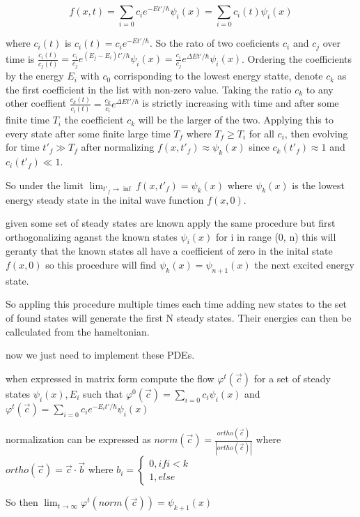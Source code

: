 \documentclass[%
 preprint,
 amsmath, amssymb, aps, pra, 10pt
]{revtex4-2}
\begin{document}
\[
f(x, t) = \sum_{i=0} c_i e^{-Et' / \hbar}\psi_i(x) = \sum_{i=0} c_i(t)\psi_i(x)
\]

where $c_i(t)$ is $c_i(t) = c_i e^{-Et' / \hbar}$. So the rato of two coeficients $c_i$ and $c_j$ over time is $\frac{c_i(t)}{c_j(t)} = \frac{c_i}{c_j} e^{(E_j - E_i)t' / \hbar}\psi_i(x) = \frac{c_i}{c_j} e^{\Delta Et' / \hbar}\psi_i(x)$. Ordering the coefficients by the energy $E_i$ with $c_0$ corrisponding to the lowest energy statte, denote $c_k$ as the first coefficient in the list with non-zero value. Taking the ratio $c_k$ to any other coeffient $\frac{c_k(t)}{c_i(t)} = \frac{c_k}{c_i} e^{\Delta Et' / \hbar}$ is strictly increasing with time and after some finite time $T_i$ the coefficient $c_k$ will be the larger of the two. Applying this to every state after some finite large time $T_f$ where $T_f \geq T_i$ for all $c_i$, then evolving for time $t'_f \gg T_f$ after normalizing $f(x, t'_f) \approx \psi_k(x)$ since $c_k(t'_f) \approx 1$ and $c_i(t'_f) \ll 1$.

So under the limit $\lim_{t'_f \to \inf} f(x, t'_f) = \psi_k(x)$ where $\psi_k(x)$ is the lowest energy steady state in the inital wave function $f(x, 0)$.

given some set of steady states are known apply the same procedure but first orthogonalizing aganst the known states $\psi_i(x)$ for i in range (0, n) this will geranty that the known states all have a coefficient of zero in the inital state $f(x, 0)$ so this procedure will find $\psi_k(x)=\psi_{n + 1}(x)$ the next excited energy state.

So appling this procedure multiple times each time adding new states to the set of found states will generate the first N steady states. Their energies can then be callculated from the hameltonian.

now we just need to implement these PDEs.

when expressed in matrix form compute the flow $\varphi^t(\vec{c})$ for a set of steady states $\psi_i(x), E_i$ such that $\varphi^0(\vec{c}) = \sum_{i=0}c_i \psi_i(x)$ and $\varphi^t(\vec{c}) = \sum_{i=0}c_i e^{-E_i t' / \hbar} \psi_i(x)$

normalization can be expressed as $norm(\vec{c}) = \frac{ortho(\vec{c})}{\left| ortho(\vec{c})\right|}$ where $ortho(\vec{c}) = \vec{c} \cdot \vec{b}$ where $b_i = \begin{cases}0, if i < k \\ 1, else\end{cases}$

So then $\lim_{t \to \infty} \varphi^t(norm(\vec{c})) = \psi_{k+1}(x)$ 
\end{document}
